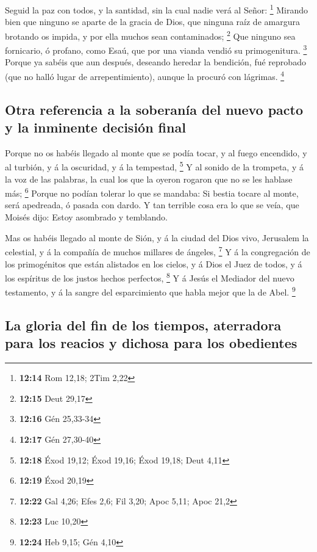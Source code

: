  Seguid la paz con todos, y la santidad, sin la cual nadie
verá al Señor: \footnote{\textbf{12:14} Rom 12,18; 2Tim 2,22}
 Mirando bien que ninguno se aparte de la gracia de Dios,
que ninguna raíz de amargura brotando os impida, y por ella muchos sean
contaminados; \footnote{\textbf{12:15} Deut 29,17}  Que
ninguno sea fornicario, ó profano, como Esaú, que por una vianda vendió
su primogenitura. \footnote{\textbf{12:16} Gén 25,33-34} 
Porque ya sabéis que aun después, deseando heredar la bendición, fué
reprobado (que no halló lugar de arrepentimiento), aunque la procuró con
lágrimas. \footnote{\textbf{12:17} Gén 27,30-40}

\hypertarget{otra-referencia-a-la-soberanuxeda-del-nuevo-pacto-y-la-inminente-decisiuxf3n-final}{%
\subsection{Otra referencia a la soberanía del nuevo pacto y la
inminente decisión
final}\label{otra-referencia-a-la-soberanuxeda-del-nuevo-pacto-y-la-inminente-decisiuxf3n-final}}

 Porque no os habéis llegado al monte que se podía tocar, y
al fuego encendido, y al turbión, y á la oscuridad, y á la tempestad,
\footnote{\textbf{12:18} Éxod 19,12; Éxod 19,16; Éxod 19,18; Deut 4,11}
 Y al sonido de la trompeta, y á la voz de las palabras, la
cual los que la oyeron rogaron que no se les hablase más; \footnote{\textbf{12:19}
  Éxod 20,19}  Porque no podían tolerar lo que se mandaba:
Si bestia tocare al monte, será apedreada, ó pasada con dardo.
 Y tan terrible cosa era lo que se veía, que Moisés dijo:
Estoy asombrado y temblando.

 Mas os habéis llegado al monte de Sión, y á la ciudad del
Dios vivo, Jerusalem la celestial, y á la compañía de muchos millares de
ángeles, \footnote{\textbf{12:22} Gal 4,26; Efes 2,6; Fil 3,20; Apoc
  5,11; Apoc 21,2}  Y á la congregación de los primogénitos
que están alistados en los cielos, y á Dios el Juez de todos, y á los
espíritus de los justos hechos perfectos, \footnote{\textbf{12:23} Luc
  10,20}  Y á Jesús el Mediador del nuevo testamento, y á
la sangre del esparcimiento que habla mejor que la de Abel. \footnote{\textbf{12:24}
  Heb 9,15; Gén 4,10}

\hypertarget{la-gloria-del-fin-de-los-tiempos-aterradora-para-los-reacios-y-dichosa-para-los-obedientes}{%
\subsection{La gloria del fin de los tiempos, aterradora para los
reacios y dichosa para los
obedientes}\label{la-gloria-del-fin-de-los-tiempos-aterradora-para-los-reacios-y-dichosa-para-los-obedientes}}

